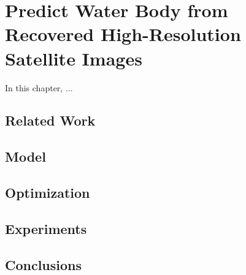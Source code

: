 \chapter{Predict Water Body from Recovered High-Resolution Satellite Images}
\label{chap-5-predict-from-recovered}
\begin{ChapAbstract}
In this chapter, ...
\end{ChapAbstract}

\section{Related Work}

\section{Model}

\section{Optimization}

\section{Experiments}

\section{Conclusions}

